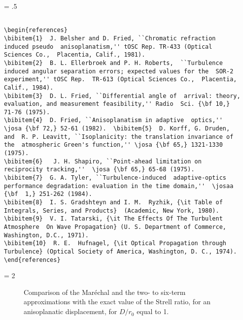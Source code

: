 \newpage
\baselineskip = .5\baselineskip  %
\begin{verbatim}

\begin{references}
\bibitem{1}  J. Belsher and D. Fried, ``Chromatic refraction
induced pseudo  anisoplanatism,'' tOSC Rep. TR-433 (Optical
Sciences Co.,  Placentia, Calif., 1981).
\bibitem{2}  B. L. Ellerbroek and P. H. Roberts,  ``Turbulence
induced angular separation errors; expected values for the  SOR-2
experiment,'' tOSC Rep.  TR-613 (Optical Sciences Co.,  Placentia,
Calif., 1984).
\bibitem{3}  D. L. Fried, ``Differential angle of  arrival: theory,
evaluation, and measurement feasibility,'' Radio  Sci. {\bf 10,}
71-76 (1975).
\bibitem{4}  D. Fried, ``Anisoplanatism in adaptive  optics,''
\josa {\bf 72,} 52-61 (1982).  \bibitem{5}  D. Korff, G. Druden,
and  R. P. Leavitt, ``Isoplanicity: the translation invariance of
the  atmospheric Green's function,'' \josa {\bf 65,} 1321-1330
(1975).
\bibitem{6}   J. H. Shapiro, ``Point-ahead limitation on
reciprocity tracking,''  \josa {\bf 65,} 65-68 (1975).
\bibitem{7}  G. A. Tyler, ``Turbulence-induced  adaptive-optics
performance degradation: evaluation in the time domain,''  \josaa
{\bf  1,} 251-262 (1984).
\bibitem{8}  I. S. Gradshteyn and I. M.  Ryzhik, {\it Table of
Integrals, Series, and Products}  (Academic, New York, 1980).
\bibitem{9}  V. I. Tatarski, {\it The Effects Of The Turbulent
Atmosphere  On Wave Propagation} (U. S. Department of Commerce,
Washington, D.C., 1971).
\bibitem{10}  R. E.  Hufnagel, {\it Optical Propagation through
Turbulence} (Optical Society of America, Washington, D. C., 1974).
\end{references}

\end{verbatim}
\newpage
\baselineskip = 2\baselineskip  %

\begin{figure}
\caption{ Comparison of the Mar\'{e}chal and the two- to six-term
approximations  with the exact value of the Strell ratio, for an
anisoplanatic displacement, for $D/r_0$  equal to 1.}\label{f1}
\end{figure}

